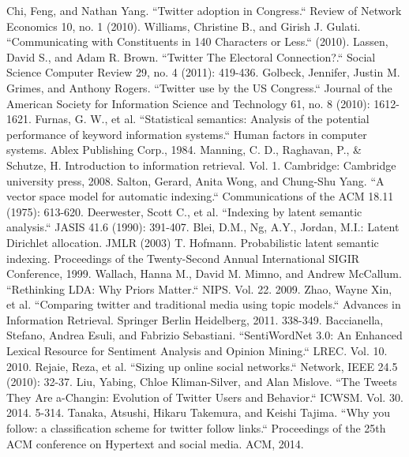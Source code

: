 \begin{thebibliography}{200}
 Chi, Feng, and Nathan Yang. ``Twitter adoption in Congress.`` Review of Network Economics 10, no. 1 (2010).\label{appendix:5.1}
 Williams, Christine B., and Girish J. Gulati. ``Communicating with Constituents in 140 Characters or Less.`` (2010).\label{appendix:5.2}
 Lassen, David S., and Adam R. Brown. ``Twitter The Electoral Connection?.`` Social Science Computer Review 29, no. 4 (2011): 419-436.\label{appendix:5.3}
 Golbeck, Jennifer, Justin M. Grimes, and Anthony Rogers. ``Twitter use by the US Congress.`` Journal of the American Society for Information Science and Technology 61, no. 8 (2010): 1612-1621.\label{appendix:5.4}
 Furnas, G. W., et al. ``Statistical semantics: Analysis of the potential performance of keyword information systems.`` Human factors in computer systems. Ablex Publishing Corp., 1984.\label{appendix:5.5}
 Manning, C. D., Raghavan, P., \& Schutze, H. Introduction to information retrieval. Vol. 1. Cambridge: Cambridge university press, 2008.\label{appendix:5.6}
 Salton, Gerard, Anita Wong, and Chung-Shu Yang. ``A vector space model for automatic indexing.`` Communications of the ACM 18.11 (1975): 613-620.\label{appendix:5.7}
 Deerwester, Scott C., et al. ``Indexing by latent semantic analysis.`` JASIS 41.6 (1990): 391-407.\label{appendix:5.8}
 Blei, D.M., Ng, A.Y., Jordan, M.I.: Latent Dirichlet allocation. JMLR (2003)\label{appendix:5.9}
 T. Hofmann. Probabilistic latent semantic indexing. Proceedings of the Twenty-Second Annual International SIGIR Conference, 1999.\label{appendix:5.10}
 Wallach, Hanna M., David M. Mimno, and Andrew McCallum. ``Rethinking LDA: Why Priors Matter.`` NIPS. Vol. 22. 2009.\label{appendix:5.11}
 Zhao, Wayne Xin, et al. ``Comparing twitter and traditional media using topic models.`` Advances in Information Retrieval. Springer Berlin Heidelberg, 2011. 338-349.\label{appendix:5.13}
 Baccianella, Stefano, Andrea Esuli, and Fabrizio Sebastiani. ``SentiWordNet 3.0: An Enhanced Lexical Resource for Sentiment Analysis and Opinion Mining.`` LREC. Vol. 10. 2010.\label{appendix:5.14}
 Rejaie, Reza, et al. ``Sizing up online social networks.`` Network, IEEE 24.5 (2010): 32-37.\label{appendix:5.17}
 Liu, Yabing, Chloe Kliman-Silver, and Alan Mislove. ``The Tweets They Are a-Changin: Evolution of Twitter Users and Behavior.`` ICWSM. Vol. 30. 2014. 5-314.\label{appendix:5.18}
 Tanaka, Atsushi, Hikaru Takemura, and Keishi Tajima. ``Why you follow: a classification scheme for twitter follow links.`` Proceedings of the 25th ACM conference on Hypertext and social media. ACM, 2014.\label{appendix:5.19}

\end{thebibliography}
